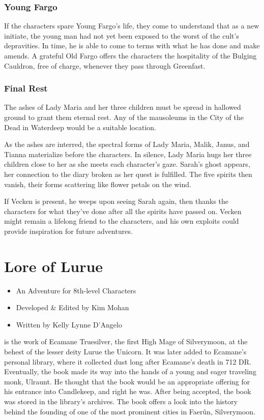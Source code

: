 \documentclass[10pt,a4paper,twoside,bg=print,twocolumn,openany,nodeprecatedcode]{dndbook}
\begin{document}
\subsection{Young Fargo}
If the characters spare Young Fargo's life, they come to understand that as a new initiate, the young man had not yet been exposed to the worst of the cult's depravities. In time, he is able to come to terms with what he has done and make amends. A grateful Old Fargo offers the characters the hospitality of the Bulging Cauldron, free of charge, whenever they pass through Greenfast.

\subsection{Final Rest}
The ashes of Lady Maria and her three children must be spread in hallowed ground to grant them eternal rest. Any of the mausoleums in the City of the Dead in Waterdeep would be a suitable location.

As the ashes are interred, the spectral forms of Lady Maria, Malik, Janus, and Tianna materialize before the characters. In silence, Lady Maria hugs her three children close to her as she meets each character's gaze. Sarah's ghost appears, her connection to the diary broken as her quest is fulfilled. The five spirits then vanish, their forms scattering like flower petals on the wind.

If Vecken is present, he weeps upon seeing Sarah again, then thanks the characters for what they've done after all the spirits have passed on. Vecken might remain a lifelong friend to the characters, and his own exploits could provide inspiration for future adventures.

\chapter{Lore of Lurue}

\begin{itemize}
\item An Adventure for 8th-level Characters
\item Developed \& Edited by Kim Mohan
\item Written by Kelly Lynne D'Angelo
\end{itemize}

 is the work of Ecamane Truesilver, the first High Mage of Silverymoon, at the behest of the lesser deity Lurue the Unicorn. It was later added to Ecamane's personal library, where it collected dust long after Ecamane's death in 712 DR. Eventually, the book made its way into the hands of a young and eager traveling monk, Ulraunt. He thought that the book would be an appropriate offering for his entrance into Candlekeep, and right he was. After being accepted, the book was stored in the library's archives. The book offers a look into the history behind the founding of one of the most prominent cities in Faerûn, Silverymoon.
\end{document}
